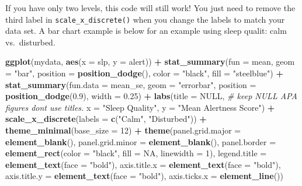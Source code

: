 \documentclass[
]{book}
\newenvironment{Shaded}{\begin{snugshade}}{\end{snugshade}}
\newcommand{\AttributeTok}[1]{\textcolor[rgb]{0.13,0.29,0.53}{#1}}
\newcommand{\CommentTok}[1]{\textcolor[rgb]{0.56,0.35,0.01}{\textit{#1}}}
\newcommand{\ConstantTok}[1]{\textcolor[rgb]{0.56,0.35,0.01}{#1}}
\newcommand{\DecValTok}[1]{\textcolor[rgb]{0.00,0.00,0.81}{#1}}
\newcommand{\FloatTok}[1]{\textcolor[rgb]{0.00,0.00,0.81}{#1}}
\newcommand{\FunctionTok}[1]{\textcolor[rgb]{0.13,0.29,0.53}{\textbf{#1}}}
\newcommand{\NormalTok}[1]{#1}
\newcommand{\SpecialCharTok}[1]{\textcolor[rgb]{0.81,0.36,0.00}{\textbf{#1}}}
\newcommand{\StringTok}[1]{\textcolor[rgb]{0.31,0.60,0.02}{#1}}
\begin{document}
If you have only two levels, this code will still work! You just need to remove the third label in \texttt{scale\_x\_discrete()} when you change the labels to match your data set. A bar chart example is below for an example using sleep qualit: calm vs.~disturbed.

\begin{Shaded}
\begin{Highlighting}[]
\FunctionTok{ggplot}\NormalTok{(mydata, }\FunctionTok{aes}\NormalTok{(}\AttributeTok{x =}\NormalTok{ slp, }\AttributeTok{y =}\NormalTok{ alert)) }\SpecialCharTok{+}
  \FunctionTok{stat\_summary}\NormalTok{(}\AttributeTok{fun =}\NormalTok{ mean, }\AttributeTok{geom =} \StringTok{"bar"}\NormalTok{,}
               \AttributeTok{position =} \FunctionTok{position\_dodge}\NormalTok{(), }\AttributeTok{color =} \StringTok{"black"}\NormalTok{,}
               \AttributeTok{fill =} \StringTok{"steelblue"}\NormalTok{) }\SpecialCharTok{+}
  \FunctionTok{stat\_summary}\NormalTok{(}\AttributeTok{fun.data =}\NormalTok{ mean\_se, }\AttributeTok{geom =} \StringTok{"errorbar"}\NormalTok{, }
               \AttributeTok{position =} \FunctionTok{position\_dodge}\NormalTok{(}\FloatTok{0.9}\NormalTok{), }\AttributeTok{width =} \FloatTok{0.25}\NormalTok{) }\SpecialCharTok{+}
  \FunctionTok{labs}\NormalTok{(}\AttributeTok{title =} \ConstantTok{NULL}\NormalTok{,   }\CommentTok{\# keep NULL APA figures don\textquotesingle{}t use titles.}
       \AttributeTok{x =} \StringTok{"Sleep Quality"}\NormalTok{,  }
       \AttributeTok{y =} \StringTok{"Mean Alertness Score"}\NormalTok{) }\SpecialCharTok{+}
  \FunctionTok{scale\_x\_discrete}\NormalTok{(}\AttributeTok{labels =} \FunctionTok{c}\NormalTok{(}\StringTok{"Calm"}\NormalTok{, }\StringTok{"Disturbed"}\NormalTok{)) }\SpecialCharTok{+}
  \FunctionTok{theme\_minimal}\NormalTok{(}\AttributeTok{base\_size =} \DecValTok{12}\NormalTok{) }\SpecialCharTok{+}
  \FunctionTok{theme}\NormalTok{(}\AttributeTok{panel.grid.major =} \FunctionTok{element\_blank}\NormalTok{(),}
        \AttributeTok{panel.grid.minor =} \FunctionTok{element\_blank}\NormalTok{(),}
        \AttributeTok{panel.border =} \FunctionTok{element\_rect}\NormalTok{(}\AttributeTok{color =} \StringTok{"black"}\NormalTok{, }\AttributeTok{fill =} \ConstantTok{NA}\NormalTok{, }\AttributeTok{linewidth =} \DecValTok{1}\NormalTok{),}
        \AttributeTok{legend.title =} \FunctionTok{element\_text}\NormalTok{(}\AttributeTok{face =} \StringTok{"bold"}\NormalTok{),}
        \AttributeTok{axis.title.x =} \FunctionTok{element\_text}\NormalTok{(}\AttributeTok{face =} \StringTok{"bold"}\NormalTok{),}
        \AttributeTok{axis.title.y =} \FunctionTok{element\_text}\NormalTok{(}\AttributeTok{face =} \StringTok{"bold"}\NormalTok{),}
        \AttributeTok{axis.ticks.x =} \FunctionTok{element\_line}\NormalTok{())}
\end{Highlighting}
\end{Shaded}
\end{document}
